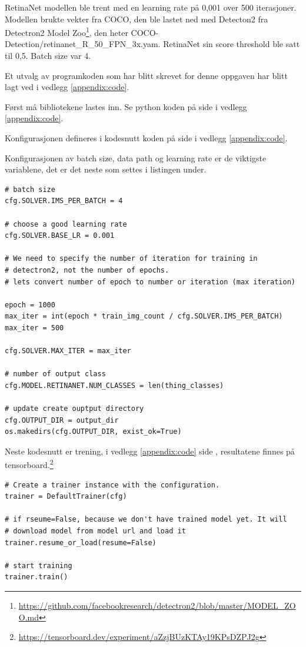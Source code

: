 RetinaNet modellen ble trent med en learning rate på 0,001 over 500 iterasjoner. Modellen brukte vekter fra COCO, den ble lastet ned med Detecton2 fra Detectron2 Model Zoo\footnote{\url{https://github.com/facebookresearch/detectron2/blob/master/MODEL_ZOO.md}}, den heter COCO-Detection/retinanet\_R\_50\_FPN\_3x.yam. RetinaNet sin score threshold ble satt til 0,5. Batch size var 4.

Et utvalg av programkoden som har blitt skrevet for denne oppgaven har blitt lagt ved i vedlegg \ref{appendix:code}.

Først må bibliotekene lastes inn. Se python koden på side \pageref{lst:load} i vedlegg \ref{appendix:code}.

Konfigurasjonen defineres i kodesnutt koden på side \pageref{lst:config} i vedlegg \ref{appendix:code}.

Konfigurasjonen av batch size, data path og learning rate er de viktigste variablene, det er det neste som settes i listingen under. 

\begin{verbatim}
# batch size
cfg.SOLVER.IMS_PER_BATCH = 4

# choose a good learning rate
cfg.SOLVER.BASE_LR = 0.001

# We need to specify the number of iteration for training in
# detectron2, not the number of epochs.
# lets convert number of epoch to number or iteration (max iteration)

epoch = 1000
max_iter = int(epoch * train_img_count / cfg.SOLVER.IMS_PER_BATCH)
max_iter = 500

cfg.SOLVER.MAX_ITER = max_iter

# number of output class
cfg.MODEL.RETINANET.NUM_CLASSES = len(thing_classes)

# update create ouptput directory
cfg.OUTPUT_DIR = output_dir
os.makedirs(cfg.OUTPUT_DIR, exist_ok=True)
\end{verbatim}

Neste kodesnutt er trening, i vedlegg \ref{appendix:code} side \pageref{lst:train}, resultatene finnes på tensorboard.\footnote{\url{https://tensorboard.dev/experiment/aZzjBUzKTAy19KPsDZPJ2g}}

\begin{verbatim}
# Create a trainer instance with the configuration.
trainer = DefaultTrainer(cfg) 

# if rseume=False, because we don't have trained model yet. It will
# download model from model url and load it
trainer.resume_or_load(resume=False)

# start training
trainer.train()
\end{verbatim}

